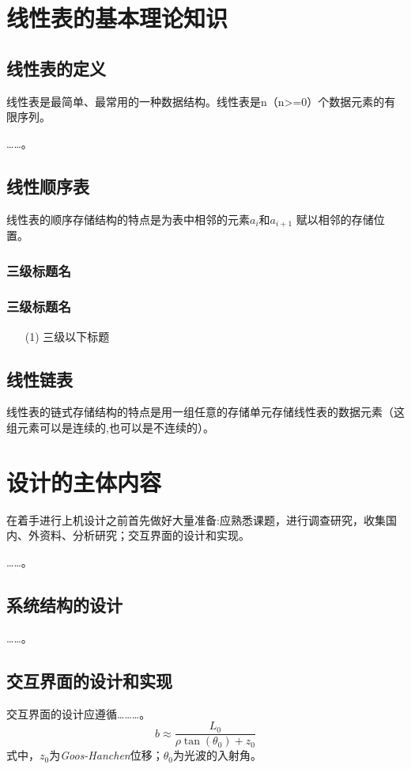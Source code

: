 \documentclass[supercite]{qustthesis}
\begin{document}
\section{线性表的基本理论知识}
\subsection{线性表的定义}
线性表是最简单、最常用\cite{Rouse1974Monitoring}的一种数据结构。线性表\cite{贾永红2010数字图像处理}是n（n>=0）个数据元素的有限序列。

……。
\subsection{线性顺序表}
线性表的顺序存储结构的特点是为表中相邻的元素$a_i$和$a_{i+1}$ 赋以相邻的存储位置。
\subsubsection{三级标题名}
\subsubsection{三级标题名}
\begin{itemize}
	\item [(1)] 三级以下标题
\end{itemize}

\subsection{线性链表}

线性表的链式存储结构的特点是用一组任意的存储单元存储线性表的数据元素（这组元素可以是连续的,也可以是不连续的）。
\section{设计的主体内容}
在着手进行上机设计之前首先做好大量准备:应熟悉课题，进行调查研究，收集国内、外资料、分析研究；交互界面的设计和实现。

……。
\subsection{系统结构的设计}
……。
\subsection{交互界面的设计和实现}
交互界面的设计应遵循………。
\begin{equation}
	b\approx\frac{L_0}{\rho\tan(\theta_0)+z_0}
\end{equation}
式中，$z_0$为\textit{Goos-Hanchen}位移；$\theta_0$为光波的入射角。
\end{document}
